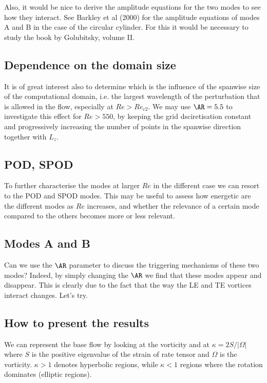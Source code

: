\documentclass{jfm}
\begin{document}
Also, it would be nice to derive the amplitude equations for the two modes to see how they interact. See Barkley et al (2000) for the amplitude equations of modes A and B in the case of the circular cylinder. For this it would be necessary to study the book by Golubitsky, volume II.


\subsection{Dependence on the domain size}

It is of great interest also to determine which is the influence of the spanwise size of the computational domain, i.e. the largest wavelength of the perturbation that is allowed in the flow, especially at $Re>Re_{c2}$. We may use $\AR=5.5$ to investigate this effect for $Re>550$, by keeping the grid dsciretisation constant and progressively increasing the number of points in the spanwise direction together with $L_z$.

\subsection{POD, SPOD}

To further characterise the modes at larger $Re$ in the different case we can resort to the POD and SPOD modes. This may be useful to assess how energetic are the different modes as $Re$ increases, and whether the relevance of a certain mode compared to the others becomes more or less relevant.

\subsection{Modes A and B}

Can we use the $\AR$ parameter to discuss the triggering mechanisms of these two modes? Indeed, by simply changing the $\AR$ we find that these modes appear and disappear. This is clearly due to the fact that the way the LE and TE vortices interact changes. Let's try.

\subsection{How to present the results}

We can represent the base flow by looking at the vorticity and at $\kappa = 2S/|\Omega|$ where $S$ is the positive eigenvalue of the strain of rate tensor and $\Omega$ is the vorticity. $\kappa>1$ denotes hyperbolic regions, while $\kappa<1$ regions where the rotation dominates (elliptic regions).
\end{document}
